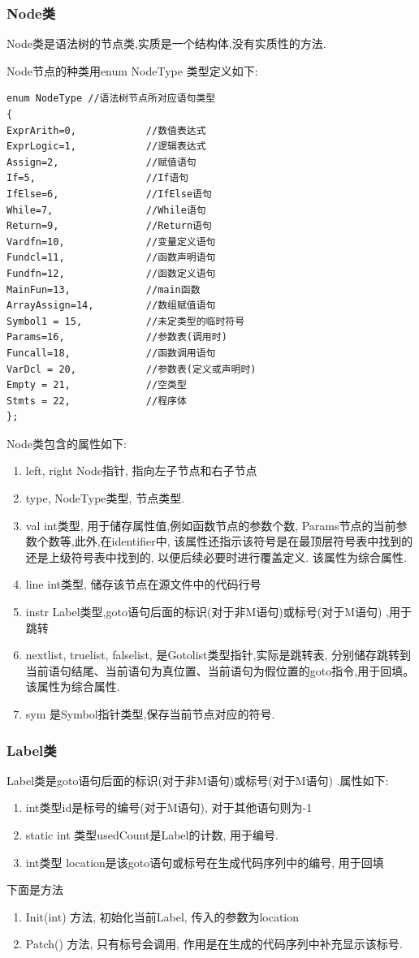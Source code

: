 \documentclass[UTF8]{article}
\begin{document}
\subsubsection{Node类} 
Node类是语法树的节点类,实质是一个结构体,没有实质性的方法.

Node节点的种类用enum NodeType
类型定义如下:
\begin{lstlisting}
enum NodeType //语法树节点所对应语句类型
{
ExprArith=0,            //数值表达式
ExprLogic=1,            //逻辑表达式
Assign=2,               //赋值语句
If=5,                   //If语句
IfElse=6,               //IfElse语句
While=7,                //While语句
Return=9,               //Return语句
Vardfn=10,              //变量定义语句
Fundcl=11,              //函数声明语句
Fundfn=12,              //函数定义语句
MainFun=13,             //main函数
ArrayAssign=14,         //数组赋值语句
Symbol1 = 15,           //未定类型的临时符号
Params=16,              //参数表(调用时)
Funcall=18,             //函数调用语句
VarDcl = 20,            //参数表(定义或声明时)
Empty = 21,             //空类型
Stmts = 22,             //程序体
};
\end{lstlisting}

Node类包含的属性如下:
\begin{enumerate}[(1)]
\item left, right Node指针, 指向左子节点和右子节点
\item type, NodeType类型, 节点类型.
\item val int类型, 用于储存属性值,例如函数节点的参数个数, Params节点的当前参数个数等,此外,在identifier中, 该属性还指示该符号是在最顶层符号表中找到的还是上级符号表中找到的, 以便后续必要时进行覆盖定义. 该属性为综合属性.
\item line int类型, 储存该节点在源文件中的代码行号
\item instr Label类型,goto语句后面的标识(对于非M语句)或标号(对于M语句) ,用于跳转
\item nextlist, truelist, falselist, 是Gotolist类型指针,实际是跳转表, 分别储存跳转到当前语句结尾、当前语句为真位置、当前语句为假位置的goto指令,用于回填。该属性为综合属性.
\item sym 是Symbol指针类型,保存当前节点对应的符号.
\end{enumerate}
\subsubsection{Label类}
Label类是goto语句后面的标识(对于非M语句)或标号(对于M语句) .属性如下:
\begin{enumerate}[(1)]
\item int类型id是标号的编号(对于M语句), 对于其他语句则为-1
\item static int 类型usedCount是Label的计数, 用于编号.
\item int类型 location是该goto语句或标号在生成代码序列中的编号, 用于回填
\end{enumerate}
下面是方法
\begin{enumerate}[(1)]
\item Init(int) 方法, 初始化当前Label, 传入的参数为location
\item Patch() 方法, 只有标号会调用, 作用是在生成的代码序列中补充显示该标号.
\end{enumerate}
\end{document}
